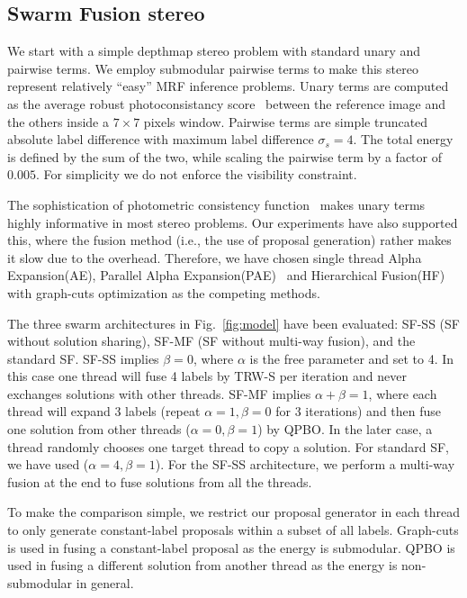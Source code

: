 \subsection{Swarm Fusion stereo}
We start with a simple depthmap stereo problem with standard unary and
pairwise terms. We employ submodular pairwise terms to make this
stereo represent relatively ``easy'' MRF inference problems.
%
Unary terms are computed as the average robust photoconsistancy
score~\cite{second_order_stereo} between the reference image and the others
inside a $7\times 7$ pixels window.  Pairwise terms are simple
truncated absolute label difference with maximum label difference
$\sigma_s=4$. The total energy is defined by the sum of the two, while
scaling the pairwise term by a factor of $0.005$. For simplicity we
do not enforce the visibility constraint.

%


\noindent The sophistication of photometric consistency
function~\cite{mvs_furukawa_survey} makes unary terms highly informative
in most stereo problems.  Our experiments have also supported this,
where the fusion method (i.e., the use of proposal generation) rather
makes it slow due to the overhead.
Therefore, we have chosen single thread Alpha Expansion(AE), Parallel
Alpha
Expansion(PAE)~\cite{fusion_moves_for_markov_random_field_optimization}
and Hierarchical
Fusion(HF)~\cite{delong_hierarchical_fusion,olga_hierarchical_alpha_expansion}
with graph-cuts optimization as the competing methods.




\noindent The three swarm architectures in Fig.~\ref{fig:model} have
been evaluated: SF-SS (SF without solution sharing), SF-MF (SF without
multi-way fusion), and the standard SF.
%
SF-SS implies $\beta=0$, where $\alpha$ is the free parameter and set to
4. In this case one thread will fuse 4 labels by TRW-S per iteration and
never exchanges solutions with other threads. SF-MF implies
$\alpha+\beta=1$, where each thread will expand 3 labels (repeat
$\alpha=1, \beta=0$ for 3 iterations) and then fuse one solution from
other threads ($\alpha=0, \beta=1$) by QPBO. In the later case, a thread
randomly chooses one target thread to copy a solution. For standard SF,
we have used ($\alpha=4, \beta=1$). For the SF-SS architecture, we
perform a multi-way fusion at the end to fuse solutions from all the threads.

%
%
%
%
To make the comparison simple, we restrict our proposal generator
in each thread to only generate constant-label proposals within a
subset of all labels. Graph-cuts is used in fusing a constant-label
proposal as the energy is submodular. QPBO is used in fusing a
different solution from another thread as the energy is
non-submodular in general.
%
